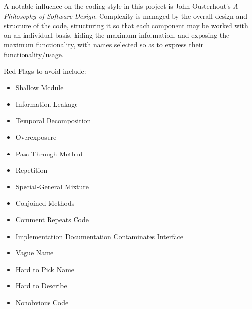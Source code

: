 \documentclass{ltxdoc}
\begin{document}
A notable influence on the coding style in this project is John Ousterhout's \emph{A Philosophy of Software Design}\cite{Ousterhout2018APO}. Complexity is managed by the overall design and structure of the code, structuring it so that each component may be worked with on an individual basis, hiding the maximum information, and exposing the maximum functionality, with names selected so as to express their functionality/usage.

Red Flags to avoid include:

\begin{itemize}
\item Shallow Module
\item Information Leakage
\item Temporal Decomposition 
\item Overexposure
\item Pass-Through Method
\item Repetition
\item Special-General Mixture
\item Conjoined Methods
\item Comment Repeats Code
\item Implementation Documentation Contaminates Interface
\item Vague Name
\item Hard to Pick Name
\item Hard to Describe
\item Nonobvious Code
\end{itemize}
\end{document}
